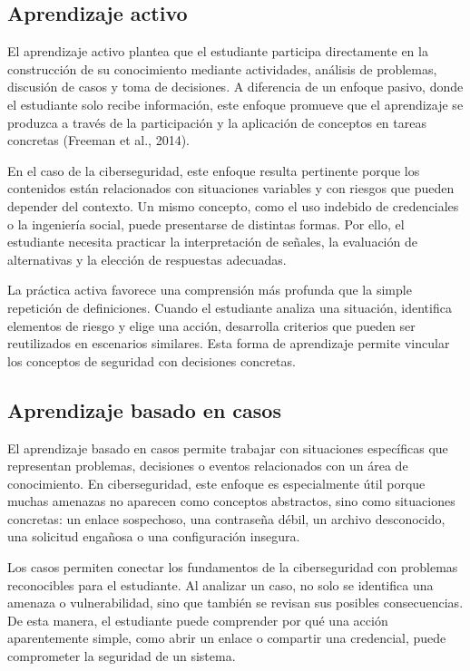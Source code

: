 \subsection{Aprendizaje activo}

El aprendizaje activo plantea que el estudiante participa directamente en la construcción de su conocimiento mediante actividades, análisis de problemas, discusión de casos y toma de decisiones. A diferencia de un enfoque pasivo, donde el estudiante solo recibe información, este enfoque promueve que el aprendizaje se produzca a través de la participación y la aplicación de conceptos en tareas concretas (Freeman et al., 2014).

En el caso de la ciberseguridad, este enfoque resulta pertinente porque los contenidos están relacionados con situaciones variables y con riesgos que pueden depender del contexto. Un mismo concepto, como el uso indebido de credenciales o la ingeniería social, puede presentarse de distintas formas. Por ello, el estudiante necesita practicar la interpretación de señales, la evaluación de alternativas y la elección de respuestas adecuadas.

La práctica activa favorece una comprensión más profunda que la simple repetición de definiciones. Cuando el estudiante analiza una situación, identifica elementos de riesgo y elige una acción, desarrolla criterios que pueden ser reutilizados en escenarios similares. Esta forma de aprendizaje permite vincular los conceptos de seguridad con decisiones concretas.

\subsection{Aprendizaje basado en casos}

El aprendizaje basado en casos permite trabajar con situaciones específicas que representan problemas, decisiones o eventos relacionados con un área de conocimiento. En ciberseguridad, este enfoque es especialmente útil porque muchas amenazas no aparecen como conceptos abstractos, sino como situaciones concretas: un enlace sospechoso, una contraseña débil, un archivo desconocido, una solicitud engañosa o una configuración insegura.

Los casos permiten conectar los fundamentos de la ciberseguridad con problemas reconocibles para el estudiante. Al analizar un caso, no solo se identifica una amenaza o vulnerabilidad, sino que también se revisan sus posibles consecuencias. De esta manera, el estudiante puede comprender por qué una acción aparentemente simple, como abrir un enlace o compartir una credencial, puede comprometer la seguridad de un sistema.

